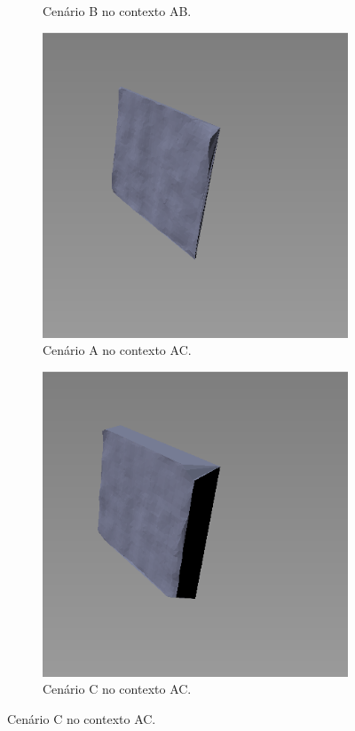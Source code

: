 \begin{figure}[H]
\begin{subfigure}[t]{0.33\textwidth}
        \caption{Cenário B no contexto AB.}
    \end{subfigure}
    \begin{subfigure}[t]{0.33\textwidth}
        \includegraphics[width=\textwidth]{dados/figuras/AB1.png}
        \caption{Cenário A no contexto AC.}
    \end{subfigure}
    \hspace{1em}
    \begin{subfigure}[t]{0.33\textwidth}
        \includegraphics[width=\textwidth]{dados/figuras/AB2.png}
        \caption{Cenário C no contexto AC.}
    \end{subfigure}
\end{figure}


